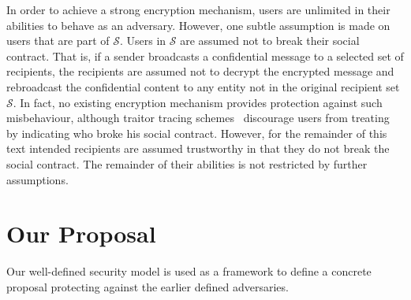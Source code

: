 In order to achieve a strong encryption mechanism, users are unlimited in their abilities to behave as an adversary. However, one subtle assumption is made on users that are part of $\mathcal{S}$. Users in $\mathcal{S}$ are assumed not to break their social contract. That is, if a sender broadcasts a confidential message to a selected set of recipients, the recipients are assumed not to decrypt the encrypted message and rebroadcast the confidential content to any entity not in the original recipient set $\mathcal{S}$. In fact, no existing encryption mechanism provides protection against such misbehaviour, although traitor tracing schemes~\cite{art:ChorFNP00} discourage users from treating by indicating who broke his social contract. However, for the remainder of this text intended recipients are assumed trustworthy in that they do not break the social contract. The remainder of their abilities is not restricted by further assumptions.

\section{Our Proposal}
\label{sec:our_proposal}
Our well-defined security model is used as a framework to define a concrete proposal protecting against the earlier defined adversaries.

